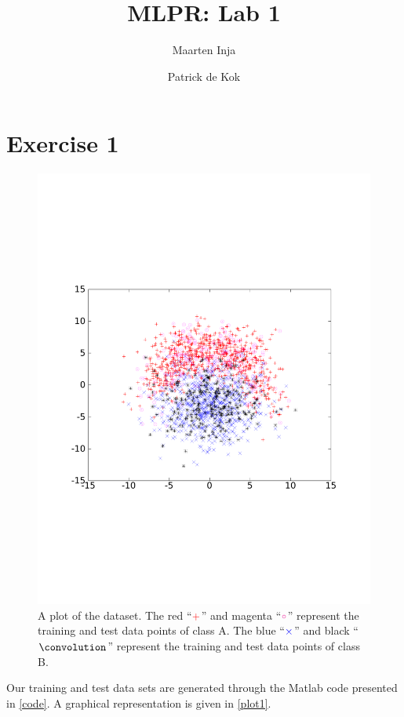 \documentclass[a4paper,11pt]{article}
\author{Maarten Inja \and Patrick de Kok}
\title{MLPR: Lab 1}
\begin{document}
\maketitle

\section*{Exercise 1}
\begin{figure}[h]
  \caption{A plot of the dataset.  The red ``$\color{red}+$'' and magenta ``$\color{magenta}\circ$'' represent the training and test data points of class A.  The blue ``$\color{blue}\times$'' and black ``$\convolution$'' represent the training and test data points of class B.}
  \label{plot1}
  \begin{center}
    \includegraphics[width=0.6\paperwidth]{plot1}
  \end{center}
\end{figure}

Our training and test data sets are generated through the Matlab code presented in \autoref{code}.  A graphical representation is given in \autoref{plot1}.
\end{document}
